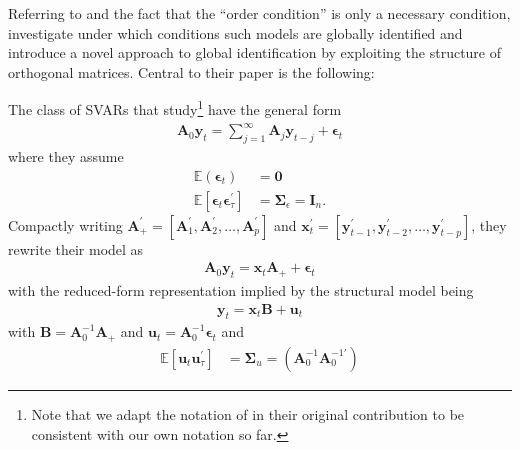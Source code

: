 \documentclass[a4paper,11pt,listof=nochaptergap,oneside,pointednumbers,bibtotoc,bigheadings,liststotoc,hidelinks]{scrbook}
\theoremstyle{mysatz}
\theoremstyle{mydefinition}
\theoremstyle{mytheorem}
\theoremstyle{mybemerkung}
\newcommand{\vect}[1]{\boldsymbol{\mathbf{#1}}}
\begin{document}
Referring to \citet{rothenberg:71} and the fact that the ``order condition'' is only a necessary condition, \citet{rubioetal:10} investigate under which conditions such models are globally identified and introduce a novel approach to global identification by exploiting the structure of orthogonal matrices. Central to their paper is the following: 

The class of SVARs that \citet{rubioetal:10} study\footnote{Note that we adapt the notation of \citet{rubioetal:10} in their original contribution to be consistent with our own notation so far.} have the general form
\begin{equation} \label{eq:svar_1}
\begin{split}
	\vect{A}_0 \vect{y}_t = \sum\limits_{j=1}^\infty \vect{A}_j\vect{y}_{t-j} + \vect{\epsilon}_t
\end{split}								
\end{equation}
where they assume 
\begin{equation}\label{eq:svar_2}
\begin{split}
	\mathbb{E}(\vect{\epsilon}_t) &  = \vect{0}  \\
	\mathbb{E}[\vect{\epsilon}_t\vect{\epsilon}_{\tau}^'] & = \vect{\Sigma}_\epsilon = \vect{I}_n.
\end{split}								
\end{equation}
Compactly writing $\vect{A}_{+}^' = [\vect{A}_1^', \vect{A}_2^', \dots, \vect{A}_p^']$ and $\vect{x}_{t}^' = [\vect{y}_{t-1}^', \vect{y}_{t-2}^', \dots, \vect{y}_{t-p}^']$, they rewrite their model as
\begin{equation}\label{eq:svar_3}
\begin{split}
	\vect{A}_0 \vect{y}_t =  \vect{x}_t \vect{A}_+ + \vect{\epsilon}_t
\end{split}								
\end{equation}
with the reduced-form representation implied by the structural model being
\begin{equation}\label{eq:svar_4}
\begin{split}
	 \vect{y}_t =  \vect{x}_t \vect{B} + \vect{u}_t
\end{split}								
\end{equation}
with $\vect{B} = \vect{A}_0^{-1}\vect{A}_+$ and $\vect{u}_t = \vect{A}_0^{-1}\vect{\epsilon}_t$ and
	\begin{equation} \label{eq:svar_5}
	\begin{split}
		\mathbb{E}[\vect{u}_t\vect{u}_{\tau}^'] & = 
      		\vect{\Sigma}_u = (\vect{A}_0^{-1}\vect{A}_0^{-1'})
	\end{split}								
	\end{equation}	
\end{document}
